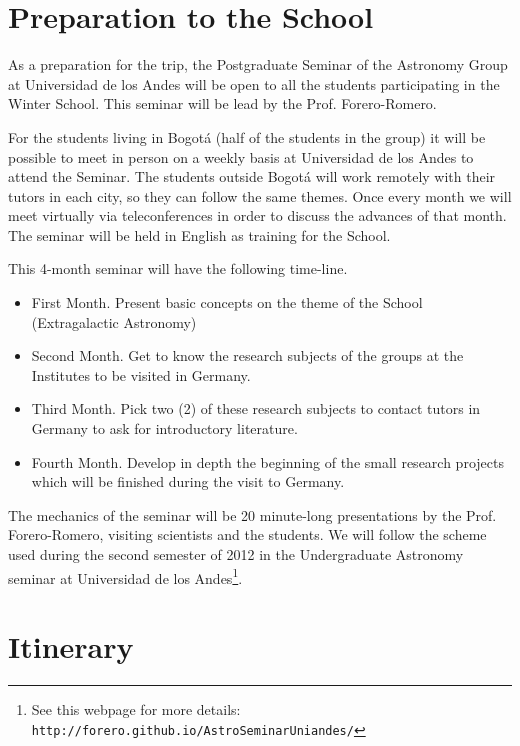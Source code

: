 \documentclass[12pt]{article}
\begin{document}
\section{Preparation to the School}
\label{sec:preparation}

As a preparation for the trip, the Postgraduate Seminar of the Astronomy
Group at Universidad de los Andes will be open to all the students participating in the
Winter School. This seminar will be lead by the Prof. Forero-Romero. 

For the students living in Bogot\'a (half of the students in the group)
it will be possible to meet in person on a weekly basis at Universidad
de los Andes to attend the Seminar. The students outside Bogot\'a
will work remotely with their tutors in each city, so they can follow the same
themes. Once every month we will meet virtually via teleconferences in
order to discuss the advances of that month. The seminar
will be held in English as training for the School. 

This 4-month seminar will have the following time-line.
\begin{itemize}
\item First Month. Present basic concepts on the theme of the School
  (Extragalactic Astronomy)
\item Second Month. Get to know the research subjects of the groups at
  the Institutes to be visited in Germany.
\item Third Month. Pick two (2) of these research subjects to contact
  tutors in Germany to ask for introductory literature.
\item Fourth Month. Develop in depth the beginning of the small
  research projects which will be finished during the visit to Germany. 
\end{itemize}

The mechanics of the seminar will be 20 minute-long presentations by the
Prof. Forero-Romero, visiting scientists and the students. We will follow the
scheme used during the second semester of 2012 in the Undergraduate
Astronomy seminar at Universidad de los Andes\footnote{See this
  webpage for more details:
  \verb"http://forero.github.io/AstroSeminarUniandes/"}. 




\section{Itinerary}
\end{document}
